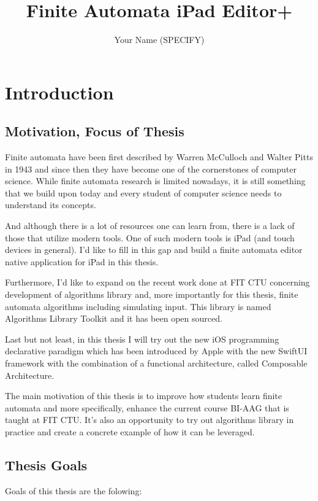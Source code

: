 \documentclass[thesis=B,english]{FITthesis}[2019/12/23]
\title{Finite Automata iPad Editor+}
\author{Your Name (SPECIFY)} %
\begin{document}

\chapter{Introduction}

\section{Motivation, Focus of Thesis}

Finite automata have been first described by Warren McCulloch and Walter Pitts in 1943 and since then they have become one of the cornerstones of computer science. While finite automata research is limited nowadays, it is still something that we build upon today and every student of computer science needs to understand its concepts.

And although there is a lot of resources one can learn from, there is a lack of those that utilize modern tools. One of such modern tools is iPad (and touch devices in general). I'd like to fill in this gap and build a finite automata editor native application for iPad in this thesis.

Furthermore, I'd like to expand on the recent work done at FIT CTU concerning development of algorithms library and, more importantly for this thesis, finite automata algorithms including simulating input. This library is named Algorithms Library Toolkit and it has been open sourced.

Last but not least, in this thesis I will try out the new iOS programming declarative paradigm which has been introduced by Apple with the new SwiftUI framework with the combination of a functional architecture, called Composable Architecture.

The main motivation of this thesis is to improve how students learn finite automata and more specifically, enhance the current course BI-AAG that is taught at FIT CTU. It's also an opportunity to try out algorithms library in practice and create a concrete example of how it can be leveraged.

\section{Thesis Goals}

Goals of this thesis are the folowing:
\end{document}

